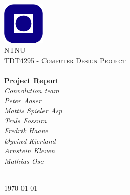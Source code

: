 \begin{titlepage}
\begin{center}
\includegraphics[width=0.15\textwidth]{img/NTNU.png}~\\[1cm]

\textsc{\LARGE NTNU}\\[1.5cm]

\textsc{\Large TDT4295 - Computer Design Project}\\[0.5cm]

\HRule \\[0.4cm]
{ \huge \bfseries Project Report}\\[0.5cm]
{\Large \textit{Convolution team}}\\[0.3cm]
{\large \textit{
Peter Aaser\\
Mattis Spieler Asp\\
Truls Fossum\\
Fredrik Haave\\
Øyvind Kjerland\\
Arnstein Kleven\\
Mathias Ose
}}\\[0.2cm]
\HRule \\[1.5cm]



\vfill

{\large \today}
\end{center}
\end{titlepage}
